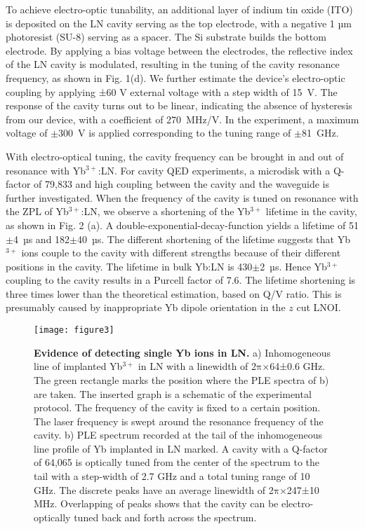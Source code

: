 \documentclass[prl,reprint,superscriptaddress]{revtex4-1}
\begin{document}
To achieve electro-optic tunability, an additional layer of indium tin oxide (ITO) is deposited on the LN cavity serving as the top electrode, with a negative 1 µm photoresist (SU-8) serving as a spacer. The Si substrate builds the bottom electrode. By applying a bias voltage between the electrodes, the reflective index of the LN cavity is modulated, resulting in the tuning of the cavity resonance frequency, as shown in Fig. 1(d). We further estimate the device's electro-optic coupling by applying ±60 V external voltage with a step width of 15~V. The response of the cavity turns out to be linear, indicating the absence of hysteresis from our device, with a coefficient of 270~MHz/V. In the experiment, a maximum voltage of $\pm$300~V is applied corresponding to the tuning range of $\pm$81~GHz.



With  electro-optical tuning, the cavity frequency can be brought in  and out of resonance with Yb$\mathrm{^{3+}}$:LN. For cavity QED experiments, a microdisk with a Q-factor of 79,833 and high coupling between the cavity and the waveguide is further investigated. When the frequency of the cavity is tuned on resonance with the ZPL of Yb$\mathrm{^{3+}}$:LN, we observe a shortening of the Yb$\mathrm{^{3+}}$ lifetime in the cavity, as shown in Fig. 2 (a). A double-exponential-decay-function yields a lifetime of 51$\pm$4~µs and 182$\pm$40~µs. The different shortening of the lifetime suggests that Yb$\mathrm{^{3+}}$ ions couple to the cavity with different strengths because of their different positions in the cavity.  The lifetime in bulk Yb:LN is 430$\pm$2~µs. Hence Yb$\mathrm{^{3+}}$ coupling to the cavity results in a Purcell factor of 7.6. The lifetime shortening is three times lower than the theoretical estimation, based on Q/V ratio. This is presumably caused by inappropriate Yb dipole orientation in the $z$ cut LNOI.  



  \begin{figure*}
\texttt{[image: figure3]}%
\caption{ \textbf{Evidence of detecting single Yb ions in LN.} a) Inhomogeneous line of implanted Yb$\mathrm{^{3+}}$ in LN with a linewidth of 2$\mathrm{\pi}$×64±0.6 GHz.  The green rectangle marks the position where the PLE spectra of b) are taken. The inserted graph is a schematic of the experimental protocol. The frequency of the cavity is fixed to a certain position. The laser frequency is swept around the resonance frequency of the cavity. b) PLE spectrum recorded at the tail of the inhomogeneous line profile of Yb implanted in LN marked. A cavity with a Q-factor of 64,065 is optically tuned from the center of the spectrum to the tail with a step-width of 2.7 GHz and a total tuning range of 10 GHz. The discrete peaks have an average linewidth of 2$\mathrm{\pi}$×247±10 MHz. Overlapping of peaks shows that the cavity can be electro-optically tuned back and forth across the spectrum. \label{figure3}}
\end{figure*}  
\end{document}
